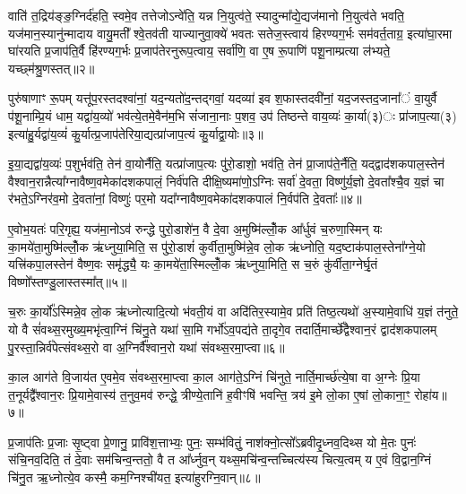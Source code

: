 वाति॑ त॒द्रिय॑ङ्ङ॒ग्निर्द॑हति॒ स्वमे॒व तत्तेजो\-ऽन्वे॑ति॒ यन्न नि॒युत्व॑ते॒ स्यादुन्मा᳚द्ये॒द्यज॑मानो नि॒युत्व॑ते भवति॒ यज॑मान॒स्यानु॑न्मादाय वायु॒मती᳚ श्वे॒तव॑ती याज्यानुवा॒क्ये॑ भवतः सतेज॒स्त्वाय॑ हिरण्यग॒र्भः सम॑वर्त॒ताग्र॒ इत्या॑घा॒रमा घा॑रयति प्र॒जाप॑ति॒र्वै हि॑रण्यग॒र्भः प्र॒जाप॑तेरनुरूप॒त्वाय॒ सर्वा॑णि॒ वा ए॒ष रू॒पाणि॑ पशू॒नाम्प्रत्या ल॑भ्यते॒ यच्छ्म॑श्रु॒णस्तत्॥२॥

पुरु॑षाणाꣳ रू॒पम् यत्तू॑प॒रस्तदश्वा॑नां॒ यद॒न्यतो॑द॒न्तद्गवां॒ यदव्या॑ इव श॒फास्तदवी॑नां॒ यद॒जस्तद॒जाना᳚ं वा॒युर्वै प॑शू॒नाम्प्रि॒यं धाम॒ यद्वा॑य॒व्यो॑ भव॑त्ये॒तमे॒वैन॑म॒भि सं॑जाना॒नाः प॒शव॒ उप॑ तिष्ठन्ते वाय॒व्यः॑ का॒र्या(३)ः प्रा॑जाप॒त्या(३) इत्या॑हु॒र्यद्वा॑य॒व्यं॑ कु॒र्यात्प्र॒जाप॑तेरिया॒द्यत्प्रा॑जाप॒त्यं कु॒र्याद्वा॒योः॥३॥

इ॒या॒द्यद्वा॑य॒व्यः॑ प॒शुर्भव॑ति॒ तेन॑ वा॒योर्नैति॒ यत्प्रा॑जाप॒त्यः पु॑रो॒डाशो॒ भव॑ति॒ तेन॑ प्रा॒जाप॑ते॒र्नैति॒ यद्द्वाद॑शकपाल॒स्तेन॑ वैश्वान॒रान्नैत्या᳚ग्नावैष्ण॒वमेका॑दशकपालं॒ निर्व॑पति दीक्षि॒ष्यमा॑णो॒\-ऽग्निः सर्वा॑ दे॒वता॒ विष्णु॑र्य॒ज्ञो दे॒वता᳚श्चै॒व य॒ज्ञं चा र॑भते॒\-ऽग्निर॑व॒मो दे॒वता॑नां॒ विष्णुः॑ पर॒मो यदा᳚ग्नावैष्ण॒वमेका॑दशकपालं नि॒र्वप॑ति दे॒वताः᳚॥४॥

ए॒वोभ॒यतः॑ परि॒गृह्य॒ यज॑मा॒नो\-ऽव॑ रुन्द्धे पुरो॒डाशे॑न॒ वै दे॒वा अ॒मुष्मि॑ल्लोँ॒क आ᳚र्धुवं च॒रुणा॒स्मिन् यः का॒मये॑ता॒मुष्मि॑ल्लोँ॒क ऋ॑ध्नुया॒मिति॒ स पु॑रो॒डाशं॑ कुर्वीता॒मुष्मि॑न्ने॒व लो॒क ऋ॑ध्नोति॒ यद॒ष्टाक॑पाल॒स्तेना᳚ग्ने॒यो यत्त्रि॑कपा॒लस्तेन॑ वैष्ण॒वः समृ॑द्ध्यै॒ यः का॒मये॑ता॒स्मिल्लोँ॒क ऋ॑ध्नुया॒मिति॒ स च॒रुं कु॑र्वीता॒ग्नेर्घृ॒तं विष्णो᳚स्तण्डु॒लास्तस्मा᳚त्॥५॥

च॒रुः का॒र्यो᳚\-ऽस्मिन्ने॒व लो॒क ऋ॑ध्नोत्यादि॒त्यो भ॑वती॒यं वा अदि॑तिर॒स्यामे॒व प्रति॑ तिष्ठ॒त्यथो॑ अ॒स्यामे॒वाधि॑ य॒ज्ञं त॑नुते॒ यो वै सं॑वथ्स॒रमुख्य॒मभृ॑त्वा॒ग्निं चि॑नु॒ते यथा॑ सा॒मि गर्भो॑\-ऽव॒पद्य॑ते ता॒दृगे॒व तदार्ति॒मार्च्छे᳚द्वैश्वान॒रं द्वाद॑शकपालम् पु॒रस्ता॒न्निर्व॑पेत्संवथ्स॒रो वा अ॒ग्निर्वै᳚श्वान॒रो यथा॑ संवथ्स॒रमा॒प्त्वा॥६॥

का॒ल आग॑ते वि॒जाय॑त ए॒वमे॒व सं॑वथ्स॒रमा॒प्त्वा का॒ल आग॑ते॒\-ऽग्निं चि॑नुते॒ नार्ति॒मार्च्छ॑त्ये॒षा वा अ॒ग्नेः प्रि॒या त॒नूर्यद्वै᳚श्वान॒रः प्रि॒यामे॒वास्य॑ त॒नुव॒मव॑ रुन्द्धे॒ त्रीण्ये॒तानि॑ ह॒वीꣳषि॑ भवन्ति॒ त्रय॑ इ॒मे लो॒का ए॒षां लो॒काना॒ꣳ॒ रोहा॑य॥७॥

{\anuvakamend[{य॒द्रिय॑ङ्वा॒युर्यच्छ्म॑श्रु॒णस्तद्वा॒योर्नि॒र्वप॑ति दे॒वता॒स्तस्मा॑दा॒प्त्वाष्टात्रिꣳ॑शच्च॥१॥}]}

प्र॒जाप॑तिः प्र॒जाः सृ॒ष्ट्वा प्रे॒णानु॒ प्रावि॑श॒त्ताभ्यः॒ पुनः॒ सम्भ॑वितुं॒ नाश॑क्नो॒त्सो᳚\-ऽब्रवीदृ॒ध्नव॒दिथ्स यो मे॒तः पुनः॑ संचि॒नव॒दिति॒ तं दे॒वाः सम॑चिन्व॒न्ततो॒ वै त आ᳚र्ध्नुव॒न् यथ्स॒मचि॑न्व॒न्तच्चित्य॑स्य चित्य॒त्वम् य ए॒वं वि॒द्वान॒ग्निं चि॑नु॒त ऋ॒ध्नोत्ये॒व कस्मै॒ कम॒ग्निश्ची॑यत॒ इत्या॑हुरग्नि॒वान्॥८॥

